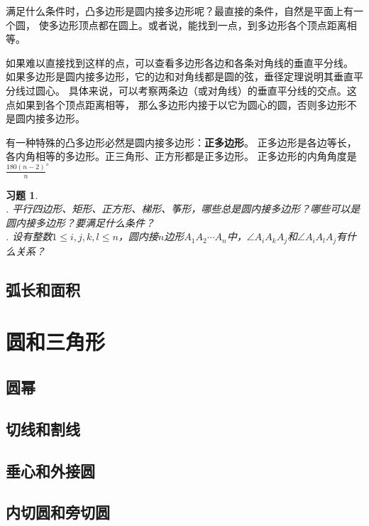 \documentclass[12pt,UTF8]{ctexbook}
\newtheorem{xt}{习题}[section]
\begin{document}
满足什么条件时，凸多边形是圆内接多边形呢？最直接的条件，自然是平面上有一个圆，
使多边形顶点都在圆上。或者说，能找到一点，到多边形各个顶点距离相等。

如果难以直接找到这样的点，可以查看多边形各边和各条对角线的垂直平分线。
如果多边形是圆内接多边形，它的边和对角线都是圆的弦，垂径定理说明其垂直平分线过圆心。
具体来说，可以考察两条边（或对角线）的垂直平分线的交点。这点如果到各个顶点距离相等，
那么多边形内接于以它为圆心的圆，否则多边形不是圆内接多边形。

有一种特殊的凸多边形必然是圆内接多边形：\textbf{正多边形}。
正多边形是各边等长，各内角相等的多边形。正三角形、正方形都是正多边形。
正多边形的内角角度是$\frac{180(n-2)}{n}^\circ$

\begin{xt}
    \mbox{}\\
    . 平行四边形、矩形、正方形、梯形、筝形，哪些总是圆内接多边形？哪些可以是圆内接多边形？要满足什么条件？\\
    . 设有整数$1 \leqslant i,j,k,l \leqslant n$，圆内接$n$边形$A_1A_2\cdots A_n$中，$\angle A_iA_kA_j$和$\angle A_iA_lA_j$有什么关系？
\end{xt}

\section{弧长和面积}




\chapter{圆和三角形}
\section{圆幂}
\section{切线和割线}
\section{垂心和外接圆}
\section{内切圆和旁切圆}
\end{document}
